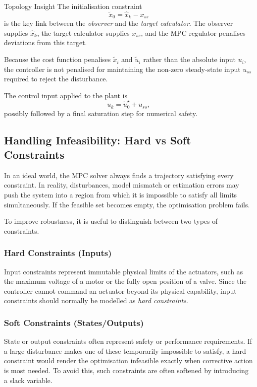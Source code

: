 \begin{notebox}{Topology Insight}
	The initialisation constraint
	\[
	\tilde x_0 = \hat x_k - x_{ss}
	\]
	is the key link between the \emph{observer} and the \emph{target calculator}. The observer supplies \(\hat x_k\), the target calculator supplies \(x_{ss}\), and the MPC regulator penalises deviations from this target.
	
	Because the cost function penalises \(\tilde x_i\) and \(\tilde u_i\) rather than the absolute input \(u_i\), the controller is not penalised for maintaining the non-zero steady-state input \(u_{ss}\) required to reject the disturbance.
\end{notebox}

The control input applied to the plant is
\[
u_k = \tilde u_0^\star + u_{ss},
\]
possibly followed by a final saturation step for numerical safety.

\subsection{Handling Infeasibility: Hard vs Soft Constraints}

In an ideal world, the MPC solver always finds a trajectory satisfying every constraint. In reality, disturbances, model mismatch or estimation errors may push the system into a region from which it is impossible to satisfy all limits simultaneously. If the feasible set becomes empty, the optimisation problem fails.

To improve robustness, it is useful to distinguish between two types of constraints.

\subsubsection*{Hard Constraints (Inputs)}
Input constraints represent immutable physical limits of the actuators, such as the maximum voltage of a motor or the fully open position of a valve. Since the controller cannot command an actuator beyond its physical capability, input constraints should normally be modelled as \emph{hard constraints}.

\subsubsection*{Soft Constraints (States/Outputs)}
State or output constraints often represent safety or performance requirements. If a large disturbance makes one of these temporarily impossible to satisfy, a hard constraint would render the optimisation infeasible exactly when corrective action is most needed. To avoid this, such constraints are often softened by introducing a slack variable.

